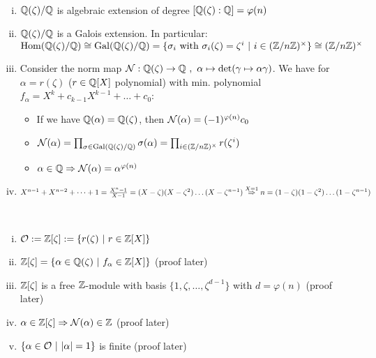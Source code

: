 \begin{remin}\ \vspace*{-\baselineskip}
\begin{enumerate}[i)]
\item $\mathbb{Q}(\zeta)/\mathbb{Q}$ is algebraic extension of degree $[\mathbb{Q}(\zeta) : \mathbb{Q}] = \varphi(n)$
\item $\mathbb{Q}(\zeta)/\mathbb{Q}$ is a Galois extension. In particular:\\
$\operatorname{Hom}(\mathbb{Q}(\zeta)/ \mathbb{Q})\cong \operatorname{Gal}(\mathbb{Q}(\zeta)/\mathbb{Q})=\{\sigma_i \text{ with } \sigma_i(\zeta)=\zeta^i \ | \ i \in (\mathbb{Z}/n\mathbb{Z})^\times\} \cong (\mathbb{Z}/n\mathbb{Z})^\times$
\item Consider the norm map $\operatorname{\mathcal{N}}: \mathbb{Q}(\zeta) \to \mathbb{Q} \ ,\ \alpha \mapsto \det( \gamma \mapsto \alpha \gamma)$. 
We have for $\alpha = r(\zeta)$ ($r \in \mathbb{Q}[X]$ polynomial) with min. polynomial $f_\alpha = X^k+c_{k-1}X^{k-1} + \dots + c_0$:
\begin{itemize}
\item  If we have $\mathbb{Q}(\alpha)=\mathbb{Q}(\zeta)$, then $\operatorname{\mathcal{N}}(\alpha)=(-1)^{\varphi(n)} c_0$
\item $\operatorname{\mathcal{N}}(\alpha)= \prod_{\sigma \in \operatorname{Gal}(\mathbb{Q}(\zeta)/\mathbb{Q})} \sigma(\alpha) = \prod_{i \in (\mathbb{Z}/n\mathbb{Z})^\times} r(\zeta^i)$
\item $\alpha \in \mathbb{Q} \Rightarrow \operatorname{\mathcal{N}}(\alpha)=\alpha^{\varphi(n)}$
\end{itemize}
\item $X^{n-1}+X^{n-2}+\dots + 1 = \frac{X^n-1}{X-1}=(X - \zeta)(X-\zeta^2)\dots (X- \zeta^{n-1})\\
\stackrel{X=1}{\Rightarrow} n=(1-\zeta)(1-\zeta^2)\dots (1- \zeta^{n-1})$
\end{enumerate}
\end{remin}

\begin{remin}\ \vspace*{- \baselineskip} 
\begin{enumerate}[i)]
\item $\mathcal{O}:=\mathbb{Z}[\zeta]:=\{ r(\zeta ) \ | \ r \in \mathbb{Z} [X]\}$
\item $\Z[\zeta]=\{\alpha \in \Q(\zeta) \ | \ f_\alpha \in \Z[X]\}$ (proof later)
\item $\mathbb{Z}[\zeta]$ is a free $\mathbb{Z}$-module with basis $\{1,\zeta, \dots, \zeta^{d-1}\}$ with $d=\varphi(n)$ (proof later)
\item $\alpha \in \mathbb{Z}[\zeta] \Rightarrow \operatorname{\mathcal{N}}(\alpha) \in \mathbb{Z}$ (proof later)
\item $\{\alpha \in \O \ | \ |\alpha|=1\}$ is finite (proof later)
\end{enumerate}
\end{remin}

